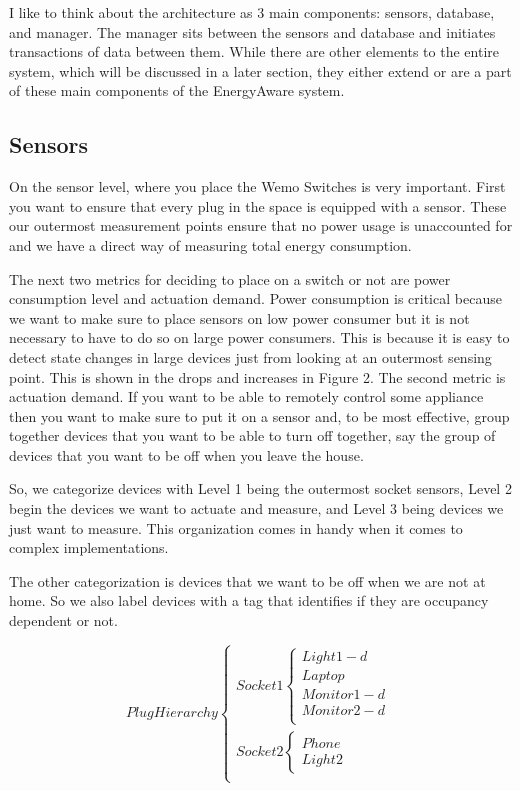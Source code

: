 \documentclass{sig-alternate-05-2015}
\begin{document}
I like to think about the architecture as 3 main components: sensors, database, and manager. The manager sits between the sensors and database and initiates transactions of data between them. While there are other elements to the entire system, which will be discussed in a later section, they either extend or are a part of these main components of the EnergyAware system.

\subsection{Sensors}
On the sensor level, where you place the Wemo Switches is very important. First you want to ensure that every plug in the space is equipped with a sensor. These our outermost measurement points ensure that no power usage is unaccounted for and we have a direct way of measuring total energy consumption.

The next two metrics for deciding to place on a switch or not are power consumption level and actuation demand. Power consumption is critical because we want to make sure to place sensors on low power consumer but it is not necessary to have to do so on large power consumers. This is because it is easy to detect state changes in large devices just from looking at an outermost sensing point. This is shown in the drops and increases in Figure 2. The second metric is actuation demand. If you want to be able to remotely control some appliance then you want to make sure to put it on a sensor and, to be most effective, group together devices that you want to be able to turn off together, say the group of devices that you want to be off when you leave the house.

So, we categorize devices with Level 1 being the outermost socket sensors, Level 2 begin the devices we want to actuate and measure, and Level 3 being devices we just want to measure. This organization comes in handy when it comes to complex implementations.

The other categorization is devices that we want to be off when we are  not at home. So we also label devices with a tag that identifies if they are occupancy dependent or not.

\[
Plug Hierarchy\begin{cases}
Socket 1
\begin{cases}
Light1 - d\\
Laptop\\
Monitor1 - d\\
Monitor2 - d\\
\end{cases}\\
Socket 2
\begin{cases}
Phone\\
Light2
\end{cases}\\
\end{cases}
\]
\end{document}
